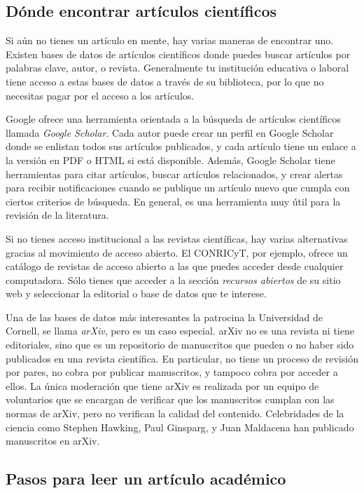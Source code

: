 \subsection*{Dónde encontrar artículos científicos}
Si aún no tienes un artículo en mente, hay varias maneras de encontrar uno.
Existen bases de datos de artículos científicos donde puedes buscar artículos
por palabras clave, autor, o revista.
Generalmente tu institución educativa o laboral tiene acceso a estas bases de
datos a través de su biblioteca, por lo que no necesitas pagar por el acceso a
los artículos.

Google ofrece una herramienta orientada a la búsqueda de artículos científicos
llamada \emph{Google Scholar}.
Cada autor puede crear un perfil en Google Scholar donde se enlistan todos sus
artículos publicados, y cada artículo tiene un enlace a la versión en PDF o HTML
si está disponible.
Además, Google Scholar tiene herramientas para citar artículos, buscar artículos
relacionados, y crear alertas para recibir notificaciones cuando se publique un
artículo nuevo que cumpla con ciertos criterios de búsqueda.
En general, es una herramienta muy útil para la revisión de la literatura.

Si no tienes acceso institucional a las revistas científicas, hay varias
alternativas gracias al movimiento de acceso abierto.
El CONRICyT, por ejemplo, ofrece un catálogo de
revistas de acceso abierto a las que puedes acceder desde cualquier computadora.
Sólo tienes que acceder a la sección \emph{recursos abiertos} de su sitio web y
seleccionar la editorial o base de datos que te interese.

Una de las bases de datos más interesantes la patrocina la Universidad de
Cornell, se llama \emph{arXiv}, pero es un caso
especial.
arXiv no es una revista ni tiene editoriales, sino que  es un repositorio de
manuscritos que pueden o no haber sido publicados en una revista científica.
En particular, no tiene un proceso de revisión por pares, no cobra por publicar
manuscritos, y tampoco cobra por acceder a ellos.
La única moderación que tiene arXiv es realizada por un equipo de voluntarios
que se encargan de verificar que los manuscritos cumplan con las normas de
arXiv, pero no verifican la calidad del contenido.
Celebridades de la ciencia como Stephen Hawking, Paul Ginsparg, y Juan Maldacena
han publicado manuscritos en arXiv.

\subsection*{Pasos para leer un artículo académico}


